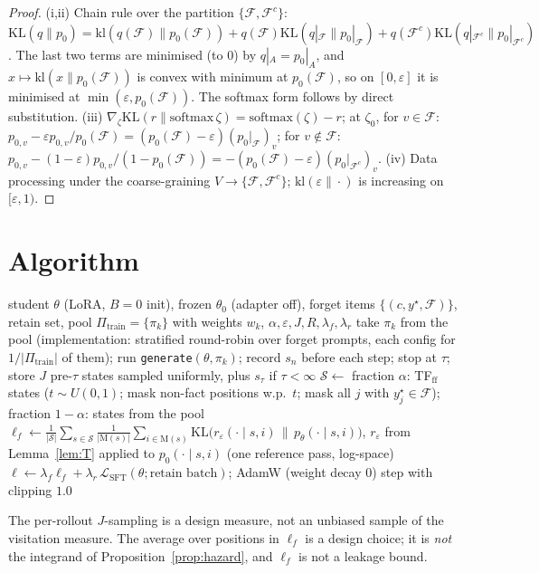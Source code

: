 \documentclass[11pt]{article}
\newcommand{\F}{\mathcal{F}}
\newcommand{\KL}{\mathrm{KL}}
\newcommand{\M}{\mathrm{M}}
\begin{document}
\begin{proof}
(i,ii) Chain rule over the partition $\{\F,\F^c\}$: $\KL(q\|p_0)=\mathrm{kl}(q(\F)\|p_0(\F))+q(\F)\KL(q|_\F\|p_0|_\F)+q(\F^c)\KL(q|_{\F^c}\|p_0|_{\F^c})$.
The last two terms are minimised (to $0$) by $q|_A=p_0|_A$, and $x\mapsto\mathrm{kl}(x\|p_0(\F))$ is convex with minimum at
$p_0(\F)$, so on $[0,\varepsilon]$ it is minimised at $\min(\varepsilon,p_0(\F))$. The softmax form follows by direct substitution.
(iii) $\nabla_\zeta\KL(r\|\mathrm{softmax}\,\zeta)=\mathrm{softmax}(\zeta)-r$; at $\zeta_0$, for $v\in\F$:
$p_{0,v}-\varepsilon p_{0,v}/p_0(\F)=(p_0(\F)-\varepsilon)(p_0|_\F)_v$; for $v\notin\F$:
$p_{0,v}-(1-\varepsilon)p_{0,v}/(1-p_0(\F))=-(p_0(\F)-\varepsilon)(p_0|_{\F^c})_v$.
(iv) Data processing under the coarse-graining $V\to\{\F,\F^c\}$; $\mathrm{kl}(\varepsilon\|\cdot)$ is increasing on $[\varepsilon,1)$.
\end{proof}

\section{Algorithm}
\begin{algorithm}[h]
\caption{FX-Mix (one optimisation step; SPEC v1.3.1 \S2)}
\begin{algorithmic}[1]
\Require student $\theta$ (LoRA, $B{=}0$ init), frozen $\theta_0$ (adapter off), forget items $\{(c,y^\star,\F)\}$, retain set,
pool $\Pi_{\text{train}}=\{\pi_k\}$ with weights $w_k$, $\alpha,\varepsilon,J,R,\lambda_f,\lambda_r$
 
   take $\pi_k$ from the pool (implementation: stratified round-robin over forget prompts, each config for $1/|\Pi_{\text{train}}|$ of them); run \texttt{generate}$(\theta,\pi_k)$; record $s_n$ before each step;
  stop at $\tau$; store $J$ pre-$\tau$ states sampled uniformly, plus $s_\tau$ if $\tau<\infty$
  \EndFor
\EndIf
\State $\mathcal{S}\gets$ fraction $\alpha$: TF$_{\text{ff}}$ states ($t\sim U(0,1)$; mask non-fact positions w.p.\ $t$; mask all $j$ with $y^\star_j\in\F$);
fraction $1-\alpha$: states from the pool
\State $\ell_f\gets \frac{1}{|\mathcal S|}\sum_{s\in\mathcal S}\frac{1}{|\M(s)|}\sum_{i\in\M(s)}\KL\big(r_\varepsilon(\cdot\mid s,i)\,\|\,p_\theta(\cdot\mid s,i)\big)$,
$r_\varepsilon$ from Lemma~\ref{lem:T} applied to $p_0(\cdot\mid s,i)$ (one reference pass, log-space)
\State $\ell\gets\lambda_f\ell_f+\lambda_r\,\mathcal{L}_{\text{SFT}}(\theta;\text{retain batch})$; AdamW (weight decay 0) step with clipping $1.0$
\end{algorithmic}
\end{algorithm}
\noindent The per-rollout $J$-sampling is a design measure, not an unbiased sample of the visitation measure. The average over positions in $\ell_f$ is a design choice; it is \emph{not} the integrand of
Proposition~\ref{prop:hazard}, and $\ell_f$ is not a leakage bound.
\end{document}
